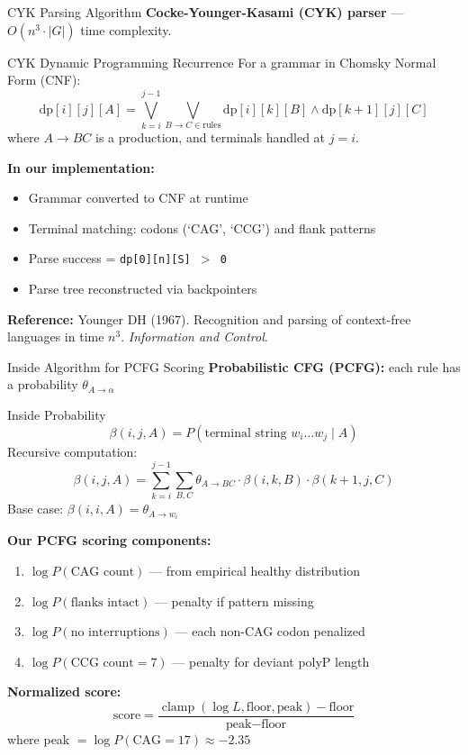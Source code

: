 \documentclass[aspectratio=169,11pt]{beamer}
\begin{document}
\begin{frame}{CYK Parsing Algorithm}
    \textbf{Cocke-Younger-Kasami (CYK) parser} --- $O(n^3 \cdot |G|)$ time complexity.

    \begin{alertblock}{CYK Dynamic Programming Recurrence}
        For a grammar in Chomsky Normal Form (CNF):
        \[
        \text{dp}[i][j][A] = \bigvee_{k=i}^{j-1} \bigvee_{B \to C \in \text{rules}} \text{dp}[i][k][B] \land \text{dp}[k+1][j][C]
        \]
        where $A \to BC$ is a production, and terminals handled at $j = i$.
    \end{alertblock}

    \textbf{In our implementation:}
    \begin{itemize}
        \item Grammar converted to CNF at runtime
        \item Terminal matching: codons (`CAG', `CCG') and flank patterns
        \item Parse success = \texttt{dp[0][n][S] $>$ 0}
        \item Parse tree reconstructed via backpointers
    \end{itemize}

    \textbf{Reference:} Younger DH (1967). Recognition and parsing of context-free languages in time $n^3$. \textit{Information and Control}.
\end{frame}

\begin{frame}{Inside Algorithm for PCFG Scoring}
    \textbf{Probabilistic CFG (PCFG):} each rule has a probability $\theta_{A \to \alpha}$

    \begin{block}{Inside Probability}
        \[
        \beta(i,j,A) = P(\text{terminal string } w_i \ldots w_j \mid A)
        \]
        Recursive computation:
        \[
        \beta(i,j,A) = \sum_{k=i}^{j-1} \sum_{B,C} \theta_{A \to BC} \cdot \beta(i,k,B) \cdot \beta(k+1,j,C)
        \]
        Base case: $\beta(i,i,A) = \theta_{A \to w_i}$
    \end{block}

    \textbf{Our PCFG scoring components:}
    \begin{enumerate}
        \item $\log P(\text{CAG count})$ --- from empirical healthy distribution
        \item $\log P(\text{flanks intact})$ --- penalty if pattern missing
        \item $\log P(\text{no interruptions})$ --- each non-CAG codon penalized
        \item $\log P(\text{CCG count} = 7)$ --- penalty for deviant polyP length
    \end{enumerate}

    \textbf{Normalized score:}
    \[
    \text{score} = \frac{\operatorname{clamp}(\log L, \text{floor}, \text{peak}) - \text{floor}}{\text{peak} - \text{floor}}
    \]
    where peak $= \log P(\text{CAG}=17) \approx -2.35$
\end{frame}
\end{document}

